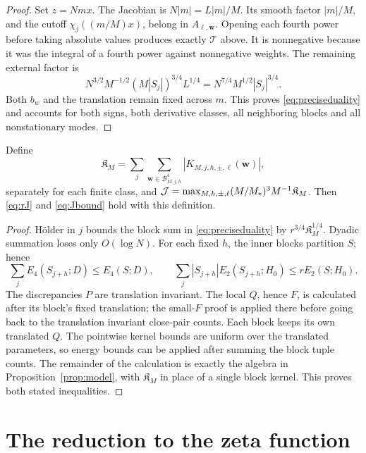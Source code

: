 \begin{proof}
Set $z=Nmx$. The Jacobian is $N|m|=L|m|/M$.
Its smooth factor $|m|/M$, and the cutoff $\chi_j((m/M)x)$, belong in
$A_{\ell,\mathbf w}$. Opening each fourth power before taking absolute
values produces exactly $\mathcal T$ above. It is nonnegative because
it was the integral of a fourth power against nonnegative weights.
The remaining external factor is
\[
 N^{3/2}M^{-1/2}(M|S_j|)^{3/4}L^{1/4}
 =N^{7/4}M^{1/2}|S_j|^{3/4}.
\]
Both $b_w$ and the translation remain fixed across $m$. This proves
\eqref{eq:preciseduality} and accounts for both signs, both derivative
classes, all neighboring blocks and all nonstationary modes.
\end{proof}

\begin{corollary}\label{cor:blockconsumer}
Define
\[
 \mathfrak K_M=\sum_j\sum_{\mathbf w\in\mathcal B_{M,j,h}^4}
 |K_{M,j,h,\pm,\ell}(\mathbf w)|,
\]
separately for each finite class, and
$\mathcal{J}=\max_{M,h,\pm,\ell}(M/M_{*})^3M^{-1}\mathfrak K_M$.
Then \eqref{eq:rJ} and \eqref{eq:Jbound} hold with this definition.
\end{corollary}
\begin{proof}
H\"older in $j$ bounds the block sum in
\eqref{eq:preciseduality} by $r^{3/4}\mathfrak K_M^{1/4}$.
Dyadic summation loses only $O(\log N)$.
For each fixed $h$, the inner blocks partition $S$; hence
\[
 \sum_jE_4(S_{j+h};D)\le E_4(S;D),\qquad
 \sum_j|S_{j+h}|E_2(S_{j+h};H_0)\le rE_2(S;H_0).
\]
The discrepancies $P$ are translation invariant. The local $Q$, hence
$F$, is calculated after its block's fixed translation; the small-$F$
proof is applied there before going back to the translation invariant
close-pair counts. Each block keeps its own translated $Q$.
The pointwise kernel bounds are uniform over the translated parameters,
so energy bounds can be applied after summing the block tuple counts.
The remainder of the calculation is exactly the algebra in
Proposition~\ref{prop:model}, with $\mathfrak K_M$ in place of a single
block kernel. This proves both stated inequalities.
\end{proof}

\section{The reduction to the zeta function}\label{app:transferproof}

